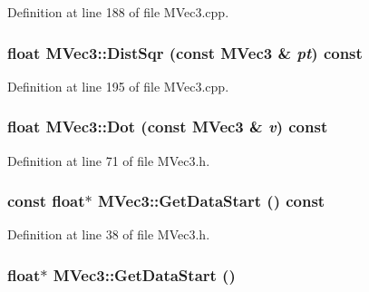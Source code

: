 Definition at line 188 of file MVec3.cpp.\hypertarget{class_m_vec3_71ac5757ebbfabeacbf4e8337f291d7d}{
\subsubsection[{DistSqr}]{\setlength{\rightskip}{0pt plus 5cm}float MVec3::DistSqr (const {\bf MVec3} \& {\em pt}) const}}
\label{class_m_vec3_71ac5757ebbfabeacbf4e8337f291d7d}




Definition at line 195 of file MVec3.cpp.\hypertarget{class_m_vec3_c224832dd149a1f44add1fa271b5b909}{
\subsubsection[{Dot}]{\setlength{\rightskip}{0pt plus 5cm}float MVec3::Dot (const {\bf MVec3} \& {\em v}) const}}
\label{class_m_vec3_c224832dd149a1f44add1fa271b5b909}




Definition at line 71 of file MVec3.h.\hypertarget{class_m_vec3_a36437bab4444c4ae78baa21ebcea624}{
\subsubsection[{GetDataStart}]{\setlength{\rightskip}{0pt plus 5cm}const float$\ast$ MVec3::GetDataStart () const}}
\label{class_m_vec3_a36437bab4444c4ae78baa21ebcea624}




Definition at line 38 of file MVec3.h.\hypertarget{class_m_vec3_a4f6338cc24ff6d594577877c261ebd8}{
\subsubsection[{GetDataStart}]{\setlength{\rightskip}{0pt plus 5cm}float$\ast$ MVec3::GetDataStart ()}}
\label{class_m_vec3_a4f6338cc24ff6d594577877c261ebd8}




